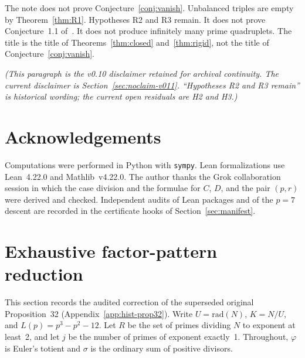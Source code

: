 \documentclass[11pt,reqno]{amsart}
\newcommand{\ph}{\varphi}
\newcommand{\sig}{\sigma}
\theoremstyle{definition}
\begin{document}
The note does not prove Conjecture~\ref{conj:vanish}. Unbalanced triples are empty by Theorem~\ref{thm:R1}. Hypotheses R2 and R3 remain. It does not prove Conjecture~1.1 of~\cite{RCW2026}. It does not produce infinitely many prime quadruplets. The title is the title of Theorems~\ref{thm:closed} and~\ref{thm:rigid}, not the title of Conjecture~\ref{conj:vanish}.

\noindent\textit{(This paragraph is the v0.10 disclaimer retained for archival continuity. The current disclaimer is Section~\ref{sec:noclaim-v011}. ``Hypotheses R2 and R3 remain'' is historical wording; the current open residuals are H2 and H3.)}

\section*{Acknowledgements}

Computations were performed in Python with \texttt{sympy}. Lean formalizations use Lean~4.22.0 and Mathlib~v4.22.0. The author thanks the Grok collaboration session in which the case division and the formulae for \(C\), \(D\), and the pair \((p,r)\) were derived and checked. Independent audits of Lean packages and of the \(p=7\) descent are recorded in the certificate hooks of Section~\ref{sec:manifest}.



\section{Exhaustive factor-pattern reduction}
\label{sec:exhaustive}

This section records the audited correction of the superseded original Proposition~32 (Appendix~\ref{app:hist-prop32}). Write \(U=\mathrm{rad}(N)\), \(K=N/U\), and \(L(p)=p^3-p^2-12\). Let \(R\) be the set of primes dividing \(N\) to exponent at least~2, and let \(j\) be the number of primes of exponent exactly~1. Throughout, \(\ph\) is Euler's totient and \(\sig\) is the ordinary sum of positive divisors.
\end{document}

